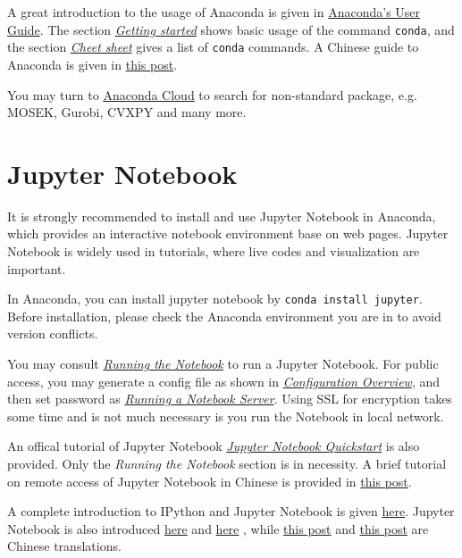 \documentclass[english]{../TeXTemplate/pkupaper}
\begin{document}
A great introduction to the usage of Anaconda is given in \href{https://conda.io/docs/user-guide/index.html}{Anaconda's User Guide}. The section \href{https://conda.io/docs/user-guide/getting-started.html}{\emph{Getting started}} shows basic usage of the command \verb"conda", and the section \href{https://conda.io/docs/user-guide/cheatsheet.html}{\emph{Cheet sheet}} gives a list of \verb"conda" commands. A Chinese guide to Anaconda is given in \href{http://www.jianshu.com/p/169403f7e40c}{this post}.

You may turn to \href{https://anaconda.org/}{Anaconda Cloud} to search for non-standard package, e.g. MOSEK, Gurobi, CVXPY and many more.

\section{Jupyter Notebook}

It is strongly recommended to install and use Jupyter Notebook in Anaconda, which provides an interactive notebook environment base on web pages. Jupyter Notebook is widely used in tutorials, where live codes and visualization are important.

In Anaconda, you can install jupyter notebook by \verb"conda install jupyter". Before installation, please check the Anaconda environment you are in to avoid version conflicts.

You may consult \href{https://jupyter.readthedocs.io/en/latest/running.html}{\emph{Running the Notebook}} to run a Jupyter Notebook. For public access, you may generate a config file as shown in \href{https://jupyter-notebook.readthedocs.io/en/stable/config_overview.html}{\emph{Configuration Overview}}, and then set password as \href{https://jupyter-notebook.readthedocs.io/en/stable/public_server.html}{\emph{Running a Notebook Server}}. Using SSL for encryption takes some time and is not much necessary is you run the Notebook in local network.

An offical tutorial of Jupyter Notebook \href{https://jupyter.readthedocs.io/en/latest/content-quickstart.html}{\emph{Jupyter Notebook Quickstart}} is also provided. Only the \emph{Running the Notebook} section is in necessity. A brief tutorial on remote access of Jupyter Notebook in Chinese is provided in \href{http://blog.csdn.net/bitboy_star/article/details/51427306}{this post}.

A complete introduction to IPython and Jupyter Notebook is given \href{http://blog.csdn.net/mzpmzk/article/details/72310105}{here}. Jupyter Notebook is also introduced \href{https://www.packtpub.com/books/content/getting-started-jupyter-notebook-part-1}{here} and \href{https://www.packtpub.com/books/content/getting-started-jupyter-notebook-part-2}{here} , while \href{http://blog.csdn.net/red_stone1/article/details/72858962}{this post} and \href{http://blog.csdn.net/red_stone1/article/details/72863749}{this post} are Chinese translations.
\end{document}
